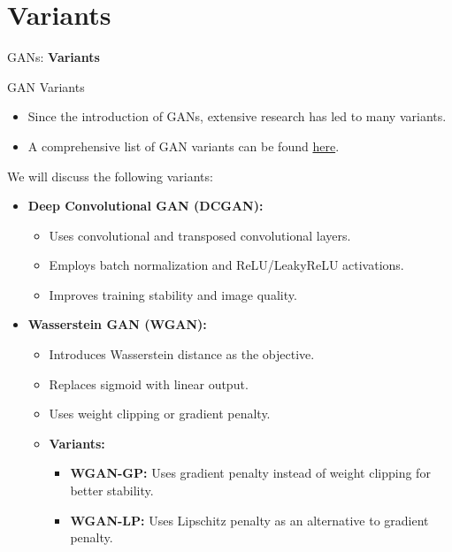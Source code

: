\section{Variants}
\begin{frame}{}
    \LARGE GANs: \textbf{Variants}
\end{frame}

\begin{frame}[allowframebreaks]{GAN Variants}
\begin{itemize}
    \item Since the introduction of GANs, extensive research has led to many variants.
    \item A comprehensive list of GAN variants can be found \href{https://github.com/hindupuravinash/the-gan-zoo}{here}.
\end{itemize} 
    \framebreak
    
    We will discuss the following variants:
    \begin{itemize}
        \item \textbf{Deep Convolutional GAN (DCGAN):}
        \begin{itemize}
            \item Uses convolutional and transposed convolutional layers.
            \item Employs batch normalization and ReLU/LeakyReLU activations.
            \item Improves training stability and image quality.
        \end{itemize}
        \item \textbf{Wasserstein GAN (WGAN):} 
        \begin{itemize}
            \item Introduces Wasserstein distance as the objective.
            \item Replaces sigmoid with linear output.
            \item Uses weight clipping or gradient penalty.
            \item \textbf{Variants:}
            \begin{itemize}
                \item \textbf{WGAN-GP:} Uses gradient penalty instead of weight clipping for better stability.
                \item \textbf{WGAN-LP:} Uses Lipschitz penalty as an alternative to gradient penalty.
            \end{itemize}
        \end{itemize}


\end{itemize}
\end{frame}
